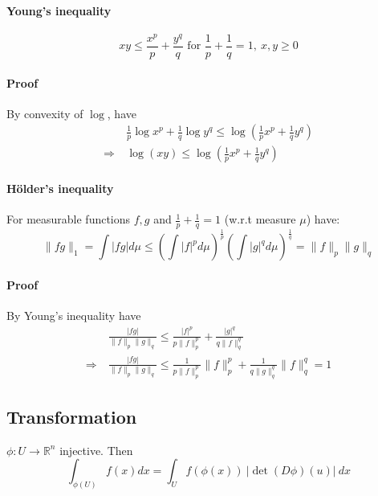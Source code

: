 \documentclass{scrartcl}
\begin{document}
\paragraph{Young's inequality}
\begin{equation}
    xy \leq \frac {x^p} p + \frac {y^q} q \text{ for } \frac 1 p + \frac 1 q = 1, \ x, y \geq 0 \nonumber
\end{equation}
\paragraph{Proof} By convexity of $\log$, have
\begin{equation}
    \begin{split}
        &\frac 1 p \log x^p + \frac 1 q \log y^q \leq \log \left( \frac 1 p x^p + \frac 1 q y^q \right) \\
        \Rightarrow \ &\log ( x y ) \leq \log \left( \frac 1 p x^p + \frac 1 q y^q \right) \nonumber
    \end{split}
\end{equation}

\paragraph{Hölder's inequality} For measurable functions $f, g$ and $\frac 1 p + \frac 1 q = 1$ (w.r.t measure $\mu$) have:
\label{hoelder_inequality}
\begin{equation}
    \| fg \|_1 = \int | fg | d\mu \leq \left( \int |f|^p d\mu \right)^{\frac 1 p} \left( \int |g|^q d\mu \right)^{\frac 1 q} = \|f\|_p \|g\|_q \nonumber
\end{equation}
\paragraph{Proof} By Young's inequality have
\begin{equation}
    \begin{split}
        &\frac {|fg|} {\| f \|_p \| g \|_q} \leq \frac {|f|^p} {p\|f\|_p^p} + \frac {|g|^q} {q\|f\|_q^q} \\
        \Rightarrow \ &\frac {|fg|} {\| f \|_p \| g \|_q} \leq \frac 1 {p \|f\|_p^p} \|f\|_p^p + \frac 1 {q \|g\|_q^q} \|f\|_q^q = 1 \nonumber
    \end{split}
\end{equation}

\subsection{Transformation}
$\phi: U \to \mathbb{R}^n$ injective. Then
\begin{equation}
    \int_{\phi(U)} f(x) dx = \int_U f(\phi(x)) \ |\det(D\phi)(u)| \ dx \nonumber
\end{equation}
\end{document}
